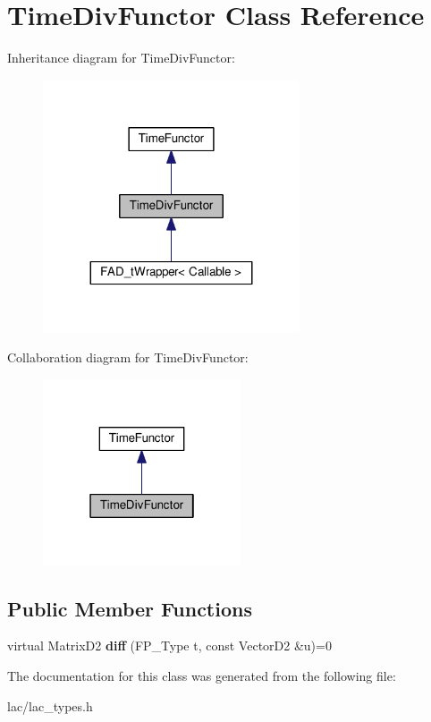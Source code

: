 \hypertarget{classTimeDivFunctor}{}\section{Time\+Div\+Functor Class Reference}
\label{classTimeDivFunctor}


Inheritance diagram for Time\+Div\+Functor\+:
\nopagebreak
\begin{figure}[H]
\begin{center}
\leavevmode
\includegraphics[width=215pt]{classTimeDivFunctor__inherit__graph}
\end{center}
\end{figure}


Collaboration diagram for Time\+Div\+Functor\+:
\nopagebreak
\begin{figure}[H]
\begin{center}
\leavevmode
\includegraphics[width=166pt]{classTimeDivFunctor__coll__graph}
\end{center}
\end{figure}
\subsection*{Public Member Functions}
\begin{DoxyCompactItemize}
\item 
\mbox{\label{classTimeDivFunctor_acbdba504a35a59e0b6687718b9d7d8ff}} 
virtual Matrix\+D2 {\bfseries diff} (F\+P\+\_\+\+Type t, const Vector\+D2 \&u)=0
\end{DoxyCompactItemize}


The documentation for this class was generated from the following file\+:\begin{DoxyCompactItemize}
\item 
lac/lac\+\_\+types.\+h\end{DoxyCompactItemize}

